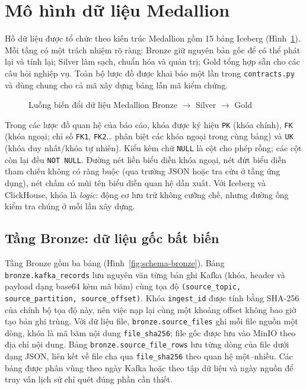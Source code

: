 \section{Mô hình dữ liệu Medallion}
\label{sec:c2-medallion}

Hồ dữ liệu được tổ chức theo kiến trúc Medallion gồm 15 bảng Iceberg (Hình~\ref{fig:medallion}). Mỗi tầng có một trách nhiệm rõ ràng: Bronze giữ nguyên bản gốc để có thể phát lại và tính lại; Silver làm sạch, chuẩn hóa và quản trị; Gold tổng hợp sẵn cho các câu hỏi nghiệp vụ. Toàn bộ lược đồ được khai báo một lần trong \texttt{contracts.py} và dùng chung cho cả mã xây dựng bảng lẫn mã kiểm chứng.

\begin{figure}[H]
    \centering
    \resizebox{\textwidth}{!}{}
    \caption{Luồng biến đổi dữ liệu Medallion Bronze $\rightarrow$ Silver $\rightarrow$ Gold}
    \label{fig:medallion}
\end{figure}

Trong các lược đồ quan hệ của báo cáo, khóa được ký hiệu \texttt{PK} (khóa chính), \texttt{FK} (khóa ngoại; chỉ số \texttt{FK1}, \texttt{FK2}\ldots{} phân biệt các khóa ngoại trong cùng bảng) và \texttt{UK} (khóa duy nhất/khóa tự nhiên). Kiểu kèm chữ \texttt{NULL} là cột cho phép rỗng; các cột còn lại đều \texttt{NOT NULL}. Đường nét liền biểu diễn khóa ngoại, nét đứt biểu diễn tham chiếu không có ràng buộc (qua trường JSON hoặc tra cứu ở tầng ứng dụng), nét chấm có mũi tên biểu diễn quan hệ dẫn xuất. Với Iceberg và ClickHouse, khóa là \emph{logic}: động cơ lưu trữ không cưỡng chế, nhưng đường ống kiểm tra chúng ở mỗi lần xây dựng.

\subsection{Tầng Bronze: dữ liệu gốc bất biến}
\label{sec:c2-bronze}

Tầng Bronze gồm ba bảng (Hình~\ref{fig:schema-bronze}). Bảng \texttt{bronze.kafka\_records} lưu nguyên văn từng bản ghi Kafka (khóa, header và payload dạng base64 kèm mã băm) cùng tọa độ \texttt{(source\_topic, source\_partition, source\_offset)}. Khóa \texttt{ingest\_id} được tính bằng SHA-256 của chính bộ tọa độ này, nên việc nạp lại cùng một khoảng offset không bao giờ tạo bản ghi trùng. Với dữ liệu file, \texttt{bronze.source\_files} ghi mỗi file nguồn một dòng, khóa là mã băm nội dung \texttt{file\_sha256}; file gốc được lưu vào MinIO theo địa chỉ nội dung. Bảng \texttt{bronze.source\_file\_rows} lưu từng dòng của file dưới dạng JSON, liên kết về file cha qua \texttt{file\_sha256} theo quan hệ một--nhiều. Các bảng được phân vùng theo ngày Kafka hoặc theo tập dữ liệu và ngày nguồn để truy vấn lịch sử chỉ quét đúng phần cần thiết.

